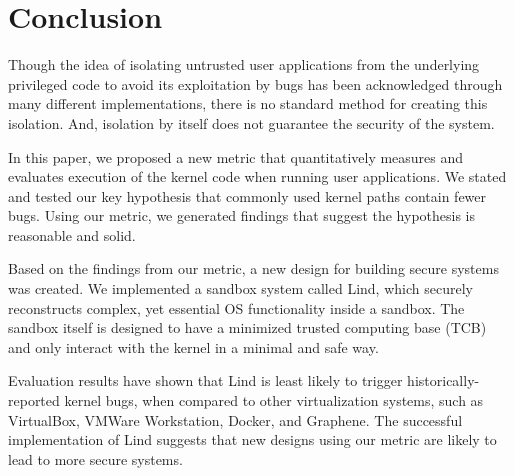 \section{Conclusion}
\label{sec.conclusion}

Though the idea of isolating untrusted user applications from the underlying privileged code 
to avoid its exploitation by bugs has been acknowledged through many different implementations, 
there is no standard method for creating this isolation. 
And, isolation by itself does not guarantee the security of the system.

In this paper, we proposed a new metric that quantitatively measures and 
evaluates execution of the kernel code when running user applications. 
We stated and tested our key hypothesis that commonly used kernel paths contain fewer bugs. 
Using our metric, we generated findings that suggest the hypothesis is reasonable and solid.

Based on the findings from our metric, a new design for building secure systems was created. 
We implemented a sandbox system called Lind, which securely reconstructs complex, 
yet essential OS functionality inside a sandbox. The sandbox itself is designed to 
have a minimized trusted computing base (TCB) and only interact with the kernel in a minimal and safe way. 

Evaluation results have shown that Lind is least likely to trigger historically-reported kernel bugs, 
when compared to other virtualization systems, such as VirtualBox, VMWare Workstation, Docker, and Graphene. 
The successful implementation of Lind suggests that new designs using our metric are likely to lead to more secure systems. 